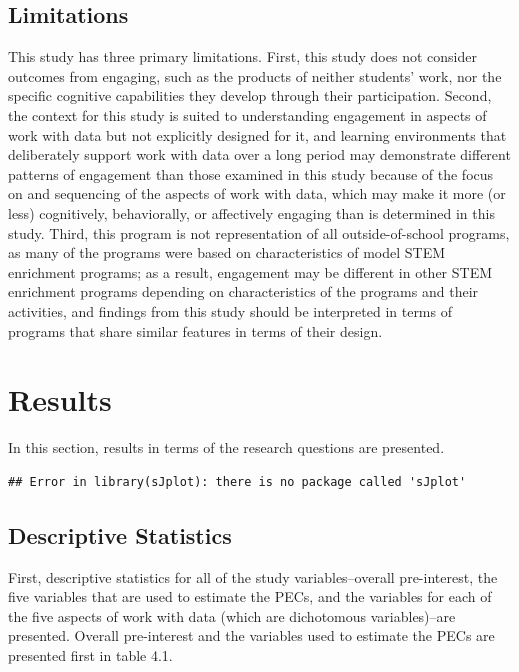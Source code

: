 \documentclass[]{msu-thesis}
\theoremstyle{definition}
\theoremstyle{definition}
\theoremstyle{definition}
\theoremstyle{remark}
\begin{document}
\section{Limitations}\label{limitations}

This study has three primary limitations. First, this study does not
consider outcomes from engaging, such as the products of neither
students' work, nor the specific cognitive capabilities they develop
through their participation. Second, the context for this study is
suited to understanding engagement in aspects of work with data but not
explicitly designed for it, and learning environments that deliberately
support work with data over a long period may demonstrate different
patterns of engagement than those examined in this study because of the
focus on and sequencing of the aspects of work with data, which may make
it more (or less) cognitively, behaviorally, or affectively engaging
than is determined in this study. Third, this program is not
representation of all outside-of-school programs, as many of the
programs were based on characteristics of model STEM enrichment
programs; as a result, engagement may be different in other STEM
enrichment programs depending on characteristics of the programs and
their activities, and findings from this study should be interpreted in
terms of programs that share similar features in terms of their design.

\chapter{Results}\label{results}

In this section, results in terms of the research questions are
presented.

\begin{verbatim}
## Error in library(sJplot): there is no package called 'sJplot'
\end{verbatim}

\section{Descriptive Statistics}\label{descriptive-statistics}

First, descriptive statistics for all of the study variables--overall
pre-interest, the five variables that are used to estimate the PECs, and
the variables for each of the five aspects of work with data (which are
dichotomous variables)--are presented. Overall pre-interest and the
variables used to estimate the PECs are presented first in table 4.1.
\end{document}
